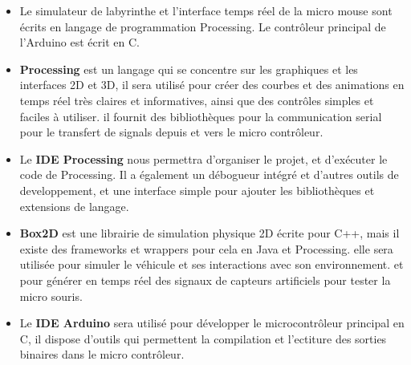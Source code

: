 \vspace{5mm}
\begin{itemize}
 
   \item Le simulateur de labyrinthe et l'interface temps réel de la micro mouse sont
écrits en langage de programmation Processing. Le contrôleur principal de
l'Arduino est écrit en C. \\

   \item \textbf{Processing} est un langage qui se concentre sur les graphiques et
les interfaces 2D et 3D, il sera utilisé pour créer des courbes et des
animations en temps réel très claires et informatives, ainsi que des
contrôles simples et faciles à utiliser. il fournit des bibliothèques pour
la communication serial pour le transfert de signals depuis et vers le micro
contrôleur. \\

 
   \item Le \textbf{IDE Processing} nous permettra d'organiser le projet, et
d'exécuter le code de Processing.  Il a également un débogueur intégré et
d'autres outils de developpement, et une interface simple pour ajouter les
bibliothèques et extensions de langage. \\

 
   \item \textbf{Box2D} est une librairie de simulation physique 2D écrite pour C++,
mais il existe des frameworks et wrappers pour cela en Java et Processing.
elle sera utilisée pour simuler le véhicule et ses interactions avec son
environnement. et pour générer en temps réel des signaux de capteurs
artificiels pour tester la micro souris. \\


   \item Le \textbf{IDE Arduino} sera utilisé pour développer le microcontrôleur
principal en C, il dispose d'outils qui permettent la compilation et
l'ectiture des sorties binaires dans le micro contrôleur. \\
\end{itemize}
